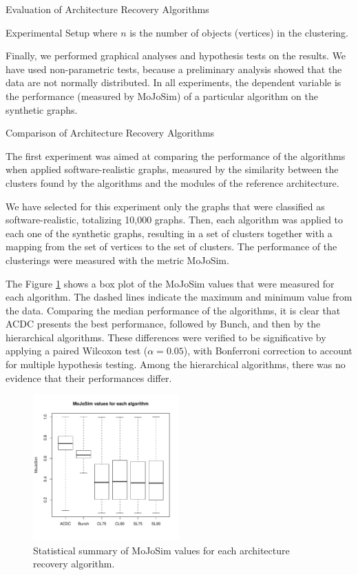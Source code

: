 \documentclass[11pt,twocolumn,a4paper,english]{article}
\begin{document}
\begin{section}{Evaluation of Architecture Recovery Algorithms}
\begin{subsection}{Experimental Setup}
	where $n$ is the number of objects (vertices) in the clustering.
	
	Finally, we performed graphical analyses and hypothesis tests on the results. We have used non-parametric tests, because a preliminary analysis showed that the data are not normally distributed. In all experiments, the dependent variable is the performance (measured by MoJoSim) of a particular algorithm on the synthetic graphs.
	
\end{subsection}

\begin{subsection}{Comparison of Architecture Recovery Algorithms}
	
	The first experiment was aimed at comparing the performance of the algorithms when applied software-realistic graphs, measured by the similarity between the clusters found by the algorithms and the modules of the reference architecture.
	
	We have selected for this experiment only the graphs that were classified as software-realistic, totalizing 10,000 graphs. Then, each algorithm was applied to each one of the synthetic graphs, resulting in a set of clusters together with a mapping from the set of vertices to the set of clusters. The performance of the clusterings were measured with the metric MoJoSim.
	
	The Figure \ref{fig:exp-algorithms} shows a box plot of the MoJoSim values that were measured for each algorithm. The dashed lines indicate the maximum and minimum value from the data. Comparing the median performance of the algorithms, it is clear that ACDC presents the best performance, followed by Bunch, and then by the hierarchical algorithms. These differences were verified to be significative by applying a paired Wilcoxon test ($\alpha = 0.05$), with Bonferroni correction to account for multiple hypothesis testing. Among the hierarchical algorithms, there was no evidence that their performances differ.
	
	\begin{figure}[htbp]
		\centering
			\includegraphics[width=0.5\textwidth]{figures/exp-algorithms}
		\caption{Statistical summary of MoJoSim values for each architecture recovery algorithm.}
		\label{fig:exp-algorithms}
	\end{figure}
	

\end{subsection}
\end{section}
\end{document}
